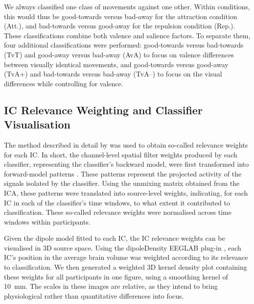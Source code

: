 We always classified one class of movements against one other. Within conditions, this would thus be good-towards versus bad-away for the attraction condition (Att.), and bad-towards versus good-away for the repulsion condition (Rep.). These classifications combine both valence and salience factors. To separate them, four additional classifications were performed: good-towards versus bad-towards (TvT) and good-away versus bad-away (AvA) to focus on valence differences between visually identical movements, and good-towards versus good-away (TvA+) and bad-towards versus bad-away (TvA--) to focus on the visual differences while controlling for valence.


\subsection{IC Relevance Weighting and Classifier Visualisation}

The method described in detail by  was used to obtain so-called relevance weights for each IC. In short, the channel-level spatial filter weights produced by each classifier, representing the classifier's backward model, were first transformed into forward-model patterns \cite{haufe2014}. These patterns represent the projected activity of the signals isolated by the classifier. Using the unmixing matrix obtained from the ICA, these patterns were translated into source-level weights, indicating, for each IC in each of the classifier's time windows, to what extent it contributed to classification. These so-called relevance weights were normalised across time windows within participants.

Given the dipole model fitted to each IC, the IC relevance weights can be visualised in 3D source space. Using the dipoleDensity EEGLAB plug-in \cite{miyakoshi2013dipdens}, each IC's position in the average brain volume was weighted according to its relevance to classification. We then generated a weighted 3D kernel density plot containing these weights for all participants in one figure, using a smoothing kernel of 10~mm. The scales in these images are relative, as they intend to bring physiological rather than quantitative differences into focus.



